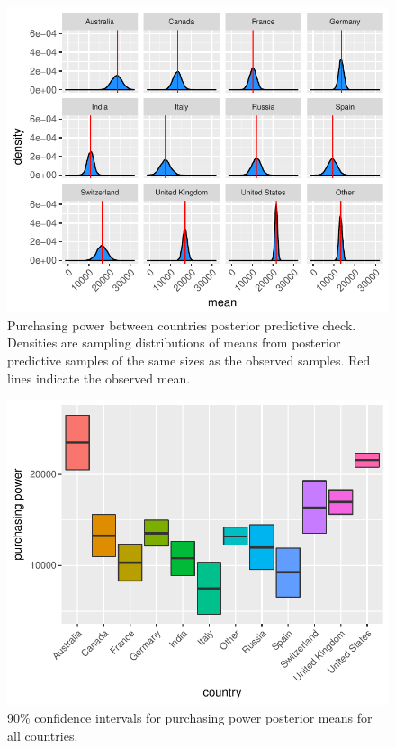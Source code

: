 \documentclass{article}
\begin{document}
\begin{figure}[H]
\centering
\includegraphics{report-027}
\caption{Purchasing power between countries posterior predictive check. Densities are sampling distributions of means from posterior predictive samples of the same sizes as the observed samples. Red lines indicate the observed mean.}\label{fig_7}
\end{figure}


\begin{figure}[H]
\centering
\includegraphics{report-029}
\caption{90\% confidence intervals for purchasing power posterior means for all countries.}\label{fig_8}
\end{figure}
\end{document}
